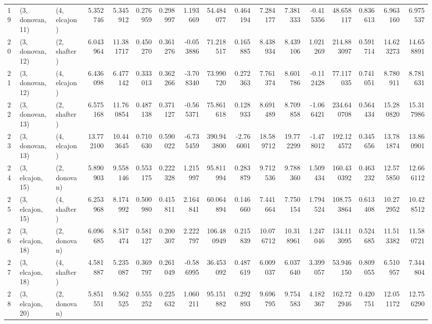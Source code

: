 \begin{tabular}{lllrrrrrrrrrrrrrr}
19 &  (3, donovan, 11) &     (4, elcajon) &   5.352746 &   5.345912 &   0.276959 &  0.298997 &   1.193669 &    54.484077 &   0.464194 &   7.284177 &   7.381333 &  -0.415356 &    48.658117 &  0.836613 &   6.963160 &   6.975537 \\
20 &  (3, donovan, 12) &     (2, shafter) &   6.043964 &  11.381717 &   0.450270 &  0.361276 &  -0.053886 &    71.218517 &   0.165885 &   8.438934 &   8.439106 &   1.021269 &   214.883097 &  0.591714 &  14.623273 &  14.658891 \\
21 &  (3, donovan, 12) &     (4, elcajon) &   6.436098 &   6.477142 &   0.333013 &  0.362266 &  -3.708340 &    73.990720 &   0.272363 &   7.761374 &   8.601786 &  -0.112428 &    77.117035 &  0.741051 &   8.780911 &   8.781631 \\
22 &  (3, donovan, 13) &     (2, shafter) &   6.575168 &  11.760854 &   0.487138 &  0.371127 &  -0.565371 &    75.861618 &   0.128933 &   8.691489 &   8.709858 &  -1.066421 &   234.640708 &  0.564434 &  15.280820 &  15.317986 \\
23 &  (3, donovan, 13) &     (4, elcajon) &  13.772100 &  10.443645 &   0.710630 &  0.590022 &  -6.735459 &   390.943800 &  -2.766001 &  18.589712 &  19.772299 &  -1.478012 &   192.124572 &  0.345656 &  13.781874 &  13.860901 \\
24 &  (3, elcajon, 15) &     (2, donovan) &   5.890903 &   9.558146 &   0.553175 &  0.222328 &   1.215997 &    95.811994 &   0.283879 &   9.712536 &   9.788360 &   1.509434 &   160.430392 &  0.463232 &  12.575850 &  12.666112 \\
25 &  (3, elcajon, 15) &     (4, shafter) &   6.253968 &   8.174992 &   0.500980 &  0.415811 &   2.164841 &    60.064894 &   0.146660 &   7.441664 &   7.750154 &   1.794524 &   108.753864 &  0.613408 &  10.272952 &  10.428512 \\
26 &  (3, elcajon, 18) &     (2, donovan) &   6.096685 &   8.517474 &   0.581127 &  0.200307 &   2.222797 &   106.480949 &   0.215839 &  10.076712 &  10.318961 &   1.247046 &   134.113095 &  0.524685 &  11.513382 &  11.580721 \\
27 &  (3, elcajon, 18) &     (4, shafter) &   4.581887 &   5.235087 &   0.369797 &  0.261049 &  -0.586995 &    36.453092 &   0.487619 &   6.009037 &   6.037640 &   3.399057 &    53.946150 &  0.809055 &   6.510957 &   7.344804 \\
28 &  (3, elcajon, 20) &     (2, donovan) &   5.851551 &   9.562525 &   0.555252 &  0.225632 &   1.060211 &    95.151882 &   0.292893 &   9.696795 &   9.754583 &   4.182367 &   162.722946 &  0.420751 &  12.051172 &  12.756290 \\

\end{tabular}
